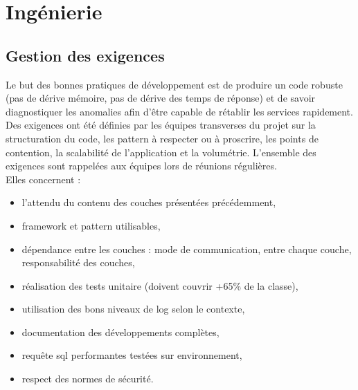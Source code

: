 \documentclass[12pt,a4paper]{article}
\begin{document}
\section{Ingénierie}
\subsection{Gestion des exigences}
Le but des bonnes pratiques de développement est de produire un code robuste (pas de dérive mémoire, pas de dérive des temps de réponse) et de savoir diagnostiquer les anomalies  afin d'être capable de rétablir les services rapidement.\\
Des exigences ont été définies par les équipes transverses du projet sur la structuration du code, les pattern à respecter ou à proscrire, les points de contention, la scalabilité de l'application et la volumétrie. L'ensemble des exigences sont rappelées aux équipes lors de réunions régulières.\\ Elles concernent :
\smallbreak
\begin{itemize}	
\item l'attendu du contenu des couches présentées précédemment,
\item framework et pattern utilisables,
\item dépendance entre les couches : mode de communication, entre chaque couche, responsabilité des couches,
\item réalisation des tests unitaire (doivent couvrir +65\% de la classe),
\item utilisation des bons niveaux de log selon le contexte,
\item documentation des développements complètes,
\item requête sql performantes testées sur environnement,
\item respect des normes de sécurité.
\end{itemize}
\medbreak
\end{document}
